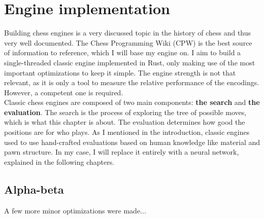 \section{Engine implementation}

Building chess engines is a very discussed topic in the history of chess and thus very well documented. The Chess Programming Wiki (CPW) \cite{cpw} is the best source of information to reference, which I will base my engine on. I aim to build a single-threaded classic engine implemented in Rust, only making use of the most important optimizations to keep it simple. The engine strength is not that relevant, as it is only a tool to measure the relative performance of the encodings. However, a competent one is required. \\

Classic chess engines are composed of two main components: \textbf{the search} and \textbf{the evaluation}. The search is the process of exploring the tree of possible moves, which is what this chapter is about. The evaluation determines how good the positions are for who plays. As I mentioned in the introduction, classic engines used to use hand-crafted evaluations based on human knowledge like material and pawn structure. In my case, I will replace it entirely with a neural network, explained in the following chapters. \\






%


\subsection{Alpha-beta}




A few more minor optimizations were made...
